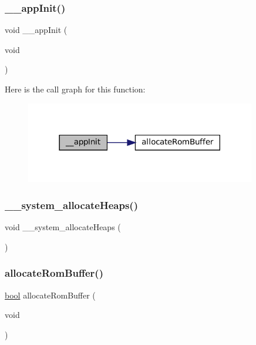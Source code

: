 \subsubsection{\texorpdfstring{\+\_\+\+\_\+app\+Init()}{\_\_appInit()}}
{\footnotesize\ttfamily void \+\_\+\+\_\+app\+Init (\begin{DoxyParamCaption}\item[{void}]{ }\end{DoxyParamCaption})}

Here is the call graph for this function\+:
\nopagebreak
\begin{figure}[H]
\begin{center}
\leavevmode
\includegraphics[width=285pt]{ctru-heap_8c_a014ed46e4e8f30997f14a0cf77e145a3_cgraph}
\end{center}
\end{figure}
\mbox{\label{ctru-heap_8c_ac8e83c882d54db69f0d13b4cf0d42a8c}} 
\subsubsection{\texorpdfstring{\+\_\+\+\_\+system\+\_\+allocate\+Heaps()}{\_\_system\_allocateHeaps()}}
{\footnotesize\ttfamily void \+\_\+\+\_\+system\+\_\+allocate\+Heaps (\begin{DoxyParamCaption}{ }\end{DoxyParamCaption})}

\mbox{\label{ctru-heap_8c_a0bd24a0db1208055a4b6ab4f7c2c3aa8}} 
\subsubsection{\texorpdfstring{allocate\+Rom\+Buffer()}{allocateRomBuffer()}}
{\footnotesize\ttfamily \mbox{\hyperlink{libretro_8h_a4a26dcae73fb7e1528214a068aca317e}{bool}} allocate\+Rom\+Buffer (\begin{DoxyParamCaption}\item[{void}]{ }\end{DoxyParamCaption})}

